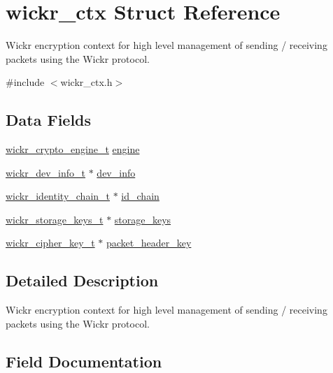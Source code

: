 \hypertarget{structwickr__ctx}{}\section{wickr\+\_\+ctx Struct Reference}
\label{structwickr__ctx}


Wickr encryption context for high level management of sending / receiving packets using the Wickr protocol.  




{\ttfamily \#include $<$wickr\+\_\+ctx.\+h$>$}

\subsection*{Data Fields}
\begin{DoxyCompactItemize}
\item 
\hyperlink{structwickr__crypto__engine}{wickr\+\_\+crypto\+\_\+engine\+\_\+t} \hyperlink{structwickr__ctx_a244c238ad74f2dbcddc280822d1fb93f}{engine}
\item 
\hyperlink{structwickr__dev__info}{wickr\+\_\+dev\+\_\+info\+\_\+t} $\ast$ \hyperlink{structwickr__ctx_a043ea3b027c4d27909f77bb195550b11}{dev\+\_\+info}
\item 
\hyperlink{structwickr__identity__chain}{wickr\+\_\+identity\+\_\+chain\+\_\+t} $\ast$ \hyperlink{structwickr__ctx_a044a292ab5cbba50fd3ec2f5bf7a00ef}{id\+\_\+chain}
\item 
\hyperlink{structwickr__storage__keys}{wickr\+\_\+storage\+\_\+keys\+\_\+t} $\ast$ \hyperlink{structwickr__ctx_ab6d3ad69a6a16c0f582186b9d8461b66}{storage\+\_\+keys}
\item 
\hyperlink{structwickr__cipher__key}{wickr\+\_\+cipher\+\_\+key\+\_\+t} $\ast$ \hyperlink{structwickr__ctx_a86da8359c914b1fec0d60e1c64fcf048}{packet\+\_\+header\+\_\+key}
\end{DoxyCompactItemize}


\subsection{Detailed Description}
Wickr encryption context for high level management of sending / receiving packets using the Wickr protocol. 

\subsection{Field Documentation}
\mbox{\label{structwickr__ctx_a043ea3b027c4d27909f77bb195550b11}} 
